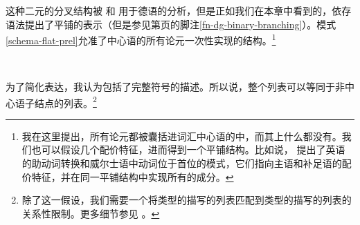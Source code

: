 这种二元的分叉结构被 \citet{Kathol95a,Kathol2000a}和 \citet{Mueller95c,Babel,Mueller99a,Mueller2002b}用于德语的分析，但是正如我们在本章中看到的，依存语法提出了平铺的表示（但是参见第\pageref{fn-dg-binary-branching}页的脚注\ref{fn-dg-binary-branching}）。模式\ref{schema-flat-prel}允准了中心语的所有论元一次性实现的结构。\footnote{我在这里提出，所有论元都被囊括进词汇中心语的\subcatlc 中，而其上什么都没有。我们也可以假设几个配价特征，进而得到一个平铺结构。比如说， \citet[]{Borsley89}提出了英语的助动词转换和威尔士语中动词位于首位的模式，它们指向主语和补足语的配价特征，并在同一平铺结构中实现所有的成分。}
\begin{schema}
\label{schema-flat-prel}
 \impl\\
\end{schema}
为了简化表达，我认为\subcatlc 包括了完整符号的描述。所以说，整个列表可以等同于非中心语子结点的列表。\footnote{%
除了这一假设，我们需要一个将类型的描写的列表匹配到类型的描写的列表的关系性限制。更多细节参见 。
}
